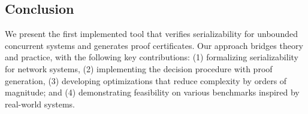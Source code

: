 %

%
%
%


\subsection{Conclusion}
We present the first implemented tool that verifies serializability for unbounded concurrent systems and generates proof certificates.
Our approach bridges theory and practice, with the following key contributions:
%
(1) formalizing serializability for network systems, (2) implementing the decision procedure with proof generation, (3) developing optimizations that reduce complexity by orders of magnitude; and (4) demonstrating feasibility on various benchmarks inspired by real-world systems.
%

